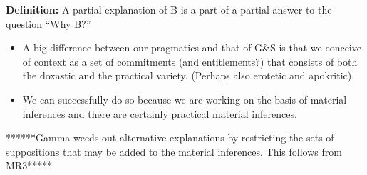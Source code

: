 \documentclass{article}                     %
\makeatletter
\theoremstyle{definition}
\newcommand{\Uuparrow}{%
	\raisebox{.2ex}{\clipbox{0pt .15pt 0pt 0pt}{$\Uparrow$}}
}
\newcommand{\thuarrow}{%
	\raisebox{.05ex}{\clipbox{0pt .8pt 0pt 0pt}{$\twoheaduparrow$}}
}
\newcommand{\nms}{%
	\mathbin{\mathpalette\@nms\expandafter}
}
\newcommand{\@nms}{\mid\joinrel\mkern-.5mu\sim}
\newcommand{\mrc}[1]{\mathbin{
		\mathchoice
		{\normalsize\hspace{.5mm}\nms^{\mkern-19mu\scriptsize\Uuparrow#1}\hspace{-.5mm}}
		{\normalsize\hspace{.5mm}\nms^{\mkern-19mu\scriptsize\Uuparrow#1}\hspace{-.5mm}}
		{\footnotesize\hspace{.5mm}\nms^{\mkern-13.5mu\fontsize{5.5}{0}\Uuparrow#1}}
		{\scriptsize\nms^{\mkern-10mu\tiny\Uuparrow#1}}
	}
}
\newcommand{\smc}{\mathbin{
		\mathchoice
		{\hspace{.4mm}\nms^{\mkern-17mu\scriptsize\thuarrow}\hspace{.6mm}}
		{\hspace{.4mm}\nms^{\mkern-17mu\scriptsize\thuarrow}\hspace{.6mm}}
		{\footnotesize\hspace{.4mm}\nms^{\mkern-11mu\tiny\thuarrow}\hspace{.6mm}}
		{\scriptsize\nms^{\mkern-10mu\tiny\thuarrow}}
	}
}
\makeatother
\begin{document}
\textbf{Definition:} A partial explanation of B is a part of a partial answer to the question ``Why B?''\\

\begin{itemize}
	\item A big difference between our pragmatics and that of G\&S is that we conceive of context as a set of commitments (and entitlements?) that consists of both the doxastic and the practical variety. (Perhaps also erotetic and apokritic).
	\item We can successfully do so because we are working on the basis of material inferences and there are certainly practical material inferences.
\end{itemize}

******Gamma weeds out alternative explanations by restricting the sets of suppositions that may be added to the material inferences. This follows from MR3*****














%



\printbibliography
\end{document}
